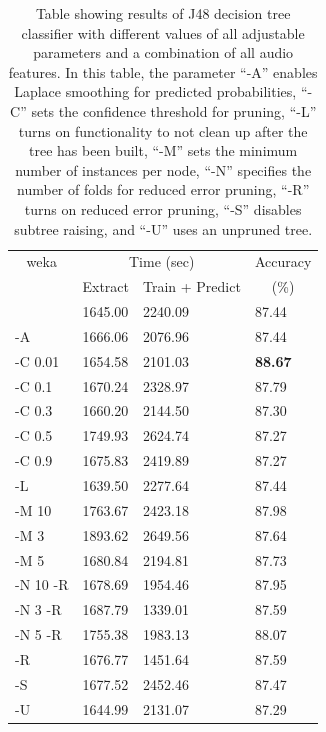 \begin{table}
\begin{tabular}{|l|l|l|l|}
\hline
\multicolumn{1}{|c|}{weka} & \multicolumn{2}{c|}{Time (sec)} & Accuracy \\
\hhline{|~|-|-|~|}
\multicolumn{1}{|c|}{param} & Extract & Train + Predict & \multicolumn{1}{c|}{(\%)} \\
\hhline{|=|=|=|=|}
           &  1645.00  &    2240.09  &  87.44  \\
 -A        &  1666.06  &    2076.96  &  87.44  \\
 -C 0.01   &  1654.58  &    2101.03  &  \textbf{88.67}  \\
 -C 0.1    &  1670.24  &    2328.97  &  87.79  \\
 -C 0.3    &  1660.20  &    2144.50  &  87.30  \\
 -C 0.5    &  1749.93  &    2624.74  &  87.27  \\
 -C 0.9    &  1675.83  &    2419.89  &  87.27  \\
 -L        &  1639.50  &    2277.64  &  87.44  \\
\hline
 -M 10     &  1763.67  &    2423.18  &  87.98  \\
 -M 3      &  1893.62  &    2649.56  &  87.64  \\
 -M 5      &  1680.84  &    2194.81  &  87.73  \\
 -N 10 -R  &  1678.69  &    1954.46  &  87.95  \\
 -N 3 -R   &  1687.79  &    1339.01  &  87.59  \\
 -N 5 -R   &  1755.38  &    1983.13  &  88.07  \\
 -R        &  1676.77  &    1451.64  &  87.59  \\
 -S        &  1677.52  &    2452.46  &  87.47  \\
 -U        &  1644.99  &    2131.07  &  87.29  \\
\hline
\end{tabular}
\caption{Table showing results of J48 decision tree classifier with
  different values of all adjustable parameters and a combination of
  all audio features.  In this table, the parameter ``-A'' enables
  Laplace smoothing for predicted probabilities, ``-C'' sets the
  confidence threshold for pruning, ``-L'' turns on functionality to
  not clean up after the tree has been built, ``-M'' sets the minimum
  number of instances per node, ``-N'' specifies the number of folds
  for reduced error pruning, ``-R'' turns on reduced error pruning,
  ``-S'' disables subtree raising, and ``-U'' uses an unpruned tree. }
\label{table:obv-weka-j48}
\end{table}

